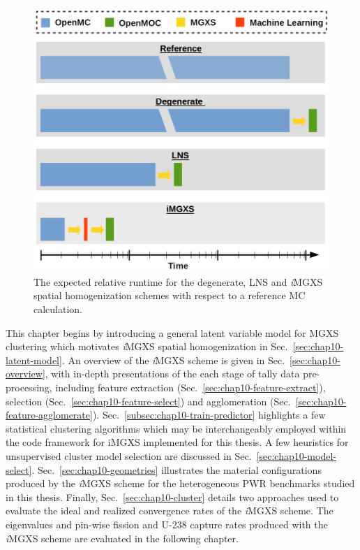 \begin{figure}[h!]
\centering
\includegraphics[width=0.6\linewidth]{figures/unsupervised/flow-chart}
\vspace{2mm}
\caption[Expected relative runtime for different homogenization schemes]{The expected relative runtime for the degenerate, \ac{LNS} and \textit{i}\ac{MGXS} spatial homogenization schemes with respect to a reference \ac{MC} calculation.}
\label{fig:chap10-flow-chart}
\end{figure}

This chapter begins by introducing a general latent variable model for \ac{MGXS} clustering which motivates \textit{i}\ac{MGXS} spatial homogenization in Sec.~\ref{sec:chap10-latent-model}. An overview of the \textit{i}\ac{MGXS} scheme is given in Sec.~\ref{sec:chap10-overview}, with in-depth presentations of the each stage of tally data pre-processing, including feature extraction (Sec.~\ref{sec:chap10-feature-extract}), selection (Sec.~\ref{sec:chap10-feature-select}) and agglomeration (Sec.~\ref{sec:chap10-feature-agglomerate}). Sec.~\ref{subsec:chap10-train-predictor} highlights a few statistical clustering algorithms which may be interchangeably employed within the code framework for i\ac{MGXS} implemented for this thesis. A few heuristics for unsupervised cluster model selection are discussed in Sec.~\ref{sec:chap10-model-select}. Sec.~\ref{sec:chap10-geometries} illustrates the material configurations produced by the \textit{i}\ac{MGXS} scheme for the heterogeneous \ac{PWR} benchmarks studied in this thesis. Finally, Sec.~\ref{sec:chap10-cluster} details two approaches used to evaluate the ideal and realized convergence rates of the \textit{i}\ac{MGXS} scheme. The eigenvalues and pin-wise fission and U-238 capture rates produced with the \textit{i}\ac{MGXS} scheme are evaluated in the following chapter.


